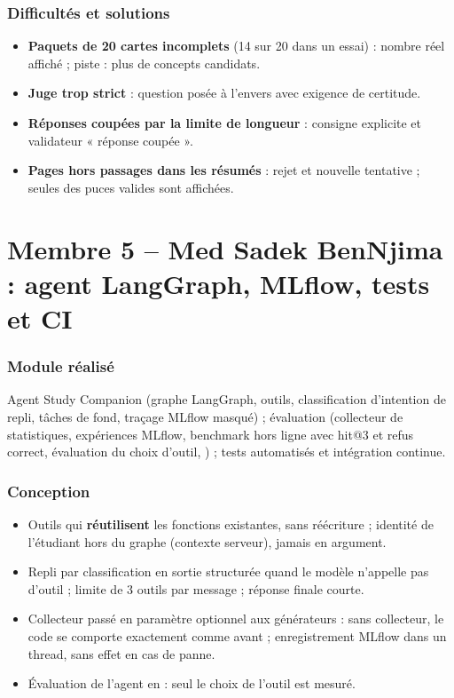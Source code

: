 \documentclass[12pt,a4paper]{report}
\newcommand{\membreCinq}{Med Sadek BenNjima}
\DeclareRobustCommand{\code}[1]{\texttt{\codecasse{#1}}}
\begin{document}
\subsubsection{Difficultés et solutions}
\begin{itemize}
  \item \textbf{Paquets de 20 cartes incomplets} (14 sur 20 dans un essai) : nombre réel affiché ;
        piste : plus de concepts candidats.
  \item \textbf{Juge trop strict} : question posée à l'envers avec exigence de certitude.
  \item \textbf{Réponses coupées par la limite de longueur} : consigne explicite et validateur « réponse
        coupée ».
  \item \textbf{Pages hors passages dans les résumés} : rejet et nouvelle tentative ; seules des puces
        valides sont affichées.
\end{itemize}

\section{Membre 5 -- \membreCinq{} : agent LangGraph, MLflow, tests et CI}
\label{sec:contrib-m5}

\subsubsection{Module réalisé}
Agent Study Companion (graphe LangGraph, outils, classification d'intention de repli, tâches de fond,
traçage MLflow masqué) ; évaluation (collecteur de statistiques, expériences MLflow, benchmark hors ligne
avec hit@3 et refus correct, évaluation du choix d'outil, \code{/api/stats}) ; tests automatisés et
intégration continue.

\subsubsection{Conception}
\begin{itemize}
  \item Outils qui \textbf{réutilisent} les fonctions existantes, sans réécriture ; identité de
        l'étudiant hors du graphe (contexte serveur), jamais en argument.
  \item Repli par classification en sortie structurée quand le modèle n'appelle pas d'outil ; limite de
        3 outils par message ; réponse finale courte.
  \item Collecteur passé en paramètre optionnel aux générateurs : sans collecteur, le code se comporte
        exactement comme avant ; enregistrement MLflow dans un thread, sans effet en cas de panne.
  \item Évaluation de l'agent en \code{dry_run} : seul le choix de l'outil est mesuré.
\end{itemize}
\end{document}
